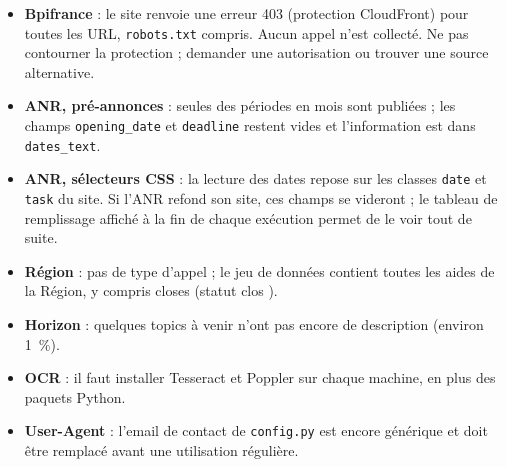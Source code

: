 \documentclass[11pt,a4paper]{article}
\newcommand{\code}[1]{\texttt{#1}}
\begin{document}
\begin{itemize}
  \item \textbf{Bpifrance} : le site renvoie une erreur 403 (protection CloudFront) pour
        toutes les URL, \code{robots.txt} compris. Aucun appel n'est collecté. Ne pas
        contourner la protection ; demander une autorisation ou trouver une source
        alternative.
  \item \textbf{ANR, pré-annonces} : seules des périodes en mois sont publiées ; les champs
        \code{opening\_date} et \code{deadline} restent vides et l'information est dans
        \code{dates\_text}.
  \item \textbf{ANR, sélecteurs CSS} : la lecture des dates repose sur les classes
        \code{date} et \code{task} du site. Si l'ANR refond son site, ces champs se
        videront ; le tableau de remplissage affiché à la fin de chaque exécution permet de
        le voir tout de suite.
  \item \textbf{Région} : pas de type d'appel ; le jeu de données contient toutes les aides
        de la Région, y compris closes (statut \og clos \fg).
  \item \textbf{Horizon} : quelques topics à venir n'ont pas encore de description
        (environ 1~\%).
  \item \textbf{OCR} : il faut installer Tesseract et Poppler sur chaque machine, en plus
        des paquets Python.
  \item \textbf{User-Agent} : l'email de contact de \code{config.py} est encore générique
        et doit être remplacé avant une utilisation régulière.
\end{itemize}
\end{document}

